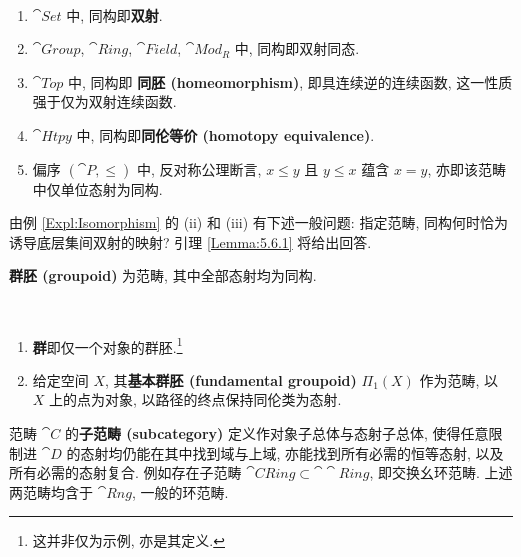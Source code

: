 \begin{example}\label{Expl:Isomorphism}
    \ \par
    \begin{enumerate}[label=(\roman*)]
        \item \(\cat{Set}\) 中, 同构即\textbf{双射}.
        \item \(\cat{Group}\), \(\cat{Ring}\), \(\cat{Field}\), \(\cat{Mod}_R\) 中, 同构即双射同态.
        \item \(\cat{Top}\) 中, 同构即 \textbf{同胚 (homeomorphism)}, 即具连续逆的连续函数, 这一性质强于仅为双射连续函数.
        \item \(\cat{Htpy}\) 中, 同构即\textbf{同伦等价 (homotopy equivalence)}.
        \item 偏序 \((\cat P,\le)\) 中, 反对称公理断言, \(x\le y\) 且 \(y\le x\) 蕴含 \(x=y\), 亦即该范畴中仅单位态射为同构.
    \end{enumerate}
\end{example}
\par 由例 \ref{Expl:Isomorphism} 的 (ii) 和 (iii) 有下述一般问题: 指定范畴, 同构何时恰为诱导底层集间双射的映射? 引理 \ref{Lemma:5.6.1} 将给出回答.
\begin{definition}
    \textbf{群胚 (groupoid)} 为范畴, 其中全部态射均为同构.
\end{definition}
\begin{example}
    \ \par
    \begin{enumerate}[label=(\roman*)]
        \item \textbf{群}即仅一个对象的群胚.\footnote{这并非仅为示例, 亦是其定义.\footnotemark}
        \item 给定空间 \(X\), 其\textbf{基本群胚 (fundamental groupoid)} \(\Pi _1(X)\) 作为范畴, 以 \(X\) 上的点为对象, 以路径的终点保持同伦类为态射.
    \end{enumerate}
\end{example}
\par 范畴 \(\cat C\) 的\textbf{子范畴 (subcategory)} 定义作对象子总体与态射子总体, 使得任意限制进 \(\cat D\) 的态射均仍能在其中找到域与上域, 亦能找到所有必需的恒等态射, 以及所有必需的态射复合. 例如存在子范畴 \(\cat{CRing}\subset\cat\cat{Ring}\), 即交换幺环范畴. 上述两范畴均含于 \(\cat{Rng}\),  一般的环范畴.
